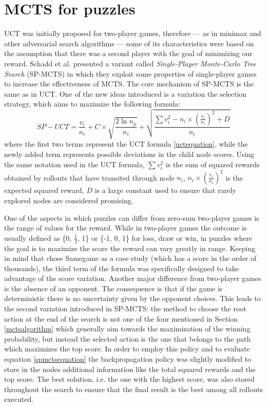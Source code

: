 \section{MCTS for puzzles}\label{sec:spmcts}
UCT was initially proposed for two-player games, therefore --- as in minimax and other adversarial search algorithms --- some of its characteristics were based on the assumption that there was a second player with the goal of minimizing our reward. Schadd et al. \cite{DBLP:journals/kbs/SchaddWTU12} presented a variant called \textit{Single-Player Monte-Carlo Tree Search} (SP-MCTS) in which they exploit some properties of single-player games to increase the effectiveness of MCTS. The core mechanism of SP-MCTS is the same as in UCT. One of the new ideas introduced is a variation the selection strategy, which aims to maximize the following formula:
\begin{equation}\label{spmctsequation}
    SP-UCT = \frac{v_i}{n_i} + C \times \sqrt{\frac{2\ln{n_p}}{n_i}} +\sqrt{\frac{\sum{v_i^2} - n_i \times (\frac{v_i}{n_i})^2 + D}{n_i}}
\end{equation} 
where the first two terms represent the UCT formula \ref{uctequation}, while the newly added term represents possible deviations in the child node scores. Using the same notation used in the UCT formula, $\sum{v_i^2}$ is the sum of squared rewards obtained by rollouts that have transited through node $n_i$, $n_i \times (\frac{v_i}{n_i})^2$ is the expected squared reward, $D$ is a large constant used to ensure that rarely explored nodes are considered promising.

\medskip\noindent
One of the aspects in which puzzles can differ from zero-sum two-player games is the range of values for the reward. While in two-player games the outcome is usually defined as \{0, $\frac{1}{2}$, 1\} or \{-1, 0, 1\} for loss, draw or win, in puzzles where the goal is to maximize the score the reward can vary greatly in range. Keeping in mind that \cite{DBLP:journals/kbs/SchaddWTU12} chose Samegame as a case study (which has a score in the order of thousands), the third term of the formula was specifically designed to take advantage of the score variation. Another major difference from two-player games is the absence of an opponent. The consequence is that if the game is deterministic there is no uncertainty given by the opponent choices. This leads to the second variation introduced in SP-MCTS: the method to choose the root action at the end of the search is not one of the four mentioned in Section \ref{mctsalgorithm} which generally aim towards the maximization of the winning probability, but instead the selected action is the one that belongs to the path which maximizes the top score. In order to employ this policy and to evaluate equation \ref{spmctsequation} the backpropagation policy was slightly modified to store in the nodes additional information like the total squared rewards and the top score. The best solution, i.e. the one with the highest score, was also stored throughout the search to ensure that the final result is the best among all rollouts executed.

